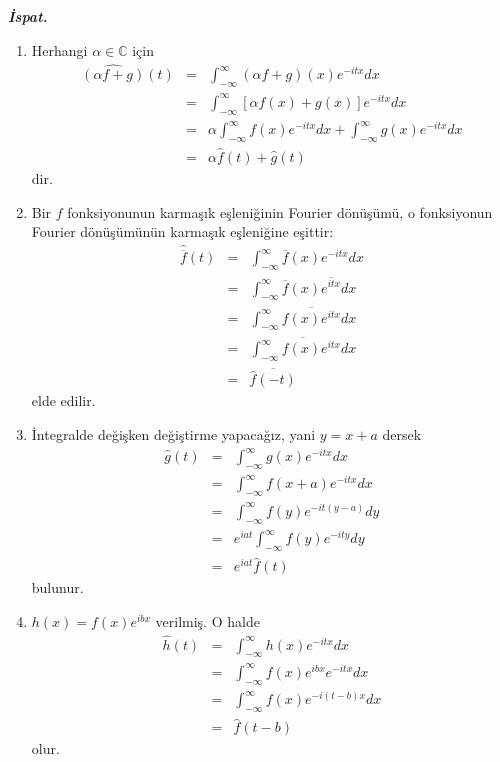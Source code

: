 \documentclass[a4paper, 9pt]{article}
\begin{document}
\textit{\textbf{İspat.}} 
\begin{enumerate}
	\item Herhangi $\alpha \in \mathbb{C}$ için 
	\begin{eqnarray*}
	\widehat{(\alpha f+g)}(t) &=& \int_{-\infty }^{\infty } (\alpha f + g)(x) e^{-itx}dx \\
	&=& \int_{-\infty }^{\infty } \left[ \alpha f(x) + g(x)\right]  e^{-itx}dx \\
	&=& \alpha \int_{-\infty }^{\infty } f(x) e^{-itx}dx + \int_{-\infty }^{\infty } g(x) e^{-itx}dx \\
	&=& \alpha \widehat{f}(t) + \widehat{g}(t) 	
	\end{eqnarray*}
dir.
	\item  Bir $f$ fonksiyonunun karmaşık eşleniğinin Fourier dönüşümü, o fonksiyonun Fourier dönüşümünün karmaşık eşleniğine eşittir:
		\begin{eqnarray*}
		\widehat{\overline{f}}(t)  &=&  \int_{-\infty }^{\infty } \overline{f}(x) e^{-itx}dx  \\ &=&  \int_{-\infty }^{\infty } \overline{f}(x) \overline{e^{itx}}dx\\ &=& \int_{-\infty }^{\infty } \overline{f(x)e^{itx}} dx \\ &=& \overline{\int_{-\infty }^{\infty } f(x)e^{itx} dx} \\ &=& \overline{\widehat{f}(-t)}  
		\end{eqnarray*}
	elde edilir.
	
	\item İntegralde değişken değiştirme yapacağız, yani $y=x+a$ dersek
		\begin{eqnarray*}
		\widehat{g}(t)  &=&  \int_{-\infty }^{\infty } g(x) e^{-itx}dx  \\ &=&  \int_{-\infty }^{\infty } {f}(x+a) e^{-itx}dx\\ &=& \int_{-\infty }^{\infty } f(y)e^{-it(y-a)} dy \\ &=& e^{iat}\int_{-\infty }^{\infty } f(y)e^{-ity} dy \\ &=& e^{iat}\widehat{f}(t)  
		\end{eqnarray*}
		bulunur.
		
	\item $h(x)=f(x)e^{ibx}$ verilmiş. O halde
		\begin{eqnarray*}
		\widehat{h}(t)  &=&  \int_{-\infty }^{\infty } h(x) e^{-itx}dx  \\ &=&  \int_{-\infty }^{\infty } {f}(x)e^{ibx} e^{-itx}dx\\ &=& \int_{-\infty }^{\infty } f(x)e^{-i(t-b)x} dx \\ &=& \widehat{f}(t-b)  
		\end{eqnarray*}
		olur.


\end{enumerate}
\end{document}

